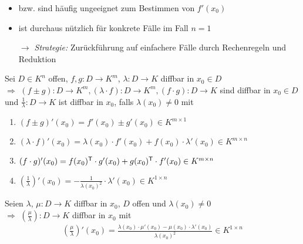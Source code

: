 \begin{underlinedenvironment}
	\hspace{0pt}
\begin{itemize}[topsep=-2pt]
	\item {} bzw.  sind häufig ungeeignet zum Bestimmen von $f'(x_0)$
	\item {} ist durchaus nützlich für konkrete Fälle im Fall $n=1$
	
	\emph{$\rightarrow$ Strategie:} Zurückführung auf einfachere Fälle durch Rechenregeln und Reduktion
\end{itemize}
\end{underlinedenvironment}

\begin{proposition}[Rechenregeln]
	Sei $D\in K^n$ offen, $f,g: D\to K^m$, $\lambda: D\to K$ \gls{diffbar} in $x_0\in D$ \\
	$\Rightarrow$ $(f\pm g): D\to K^m, (\lambda\cdot f):D\to K^m, (f\cdot g):D\to K$ sind \gls{diffbar} in $x_0\in D$ und $\frac{1}{\lambda}:D\to K$ ist \gls{diffbar} in $x_0$, falls $\lambda(x_0)\neq 0$
	mit
	\begin{enumerate}[label={\alph*)}]
		\item $(f\pm g)'(x_0) = f'(x_0) \pm g'(x_0)\in K^{m\times 1}$
		\item $(\lambda\cdot f)'(x_0) = \lambda (x_0)\cdot f'(x_0) + f(x_0)\cdot \lambda'(x_0)\in K^{m\times n}$
		\item $(f\cdot g)' (x_0) = f(x_0)^\mathsf{T}\cdot g'(x_0) + g(x_0)^\mathsf{T}\cdot f'(x_0)\in K^{m\times n}$
		\item $\left( \frac{1}{\lambda}\right)'(x_0) = - \frac{1}{\lambda(x_0)^2}\cdot \lambda'(x_0)\in K^{1\times n}$
	\end{enumerate}
\end{proposition}

\begin{conclusion}
	Seien $\lambda$, $\mu:D\to K$ \gls{diffbar} in $x_0$, $D$ offen und $\lambda(x_0)\neq 0$ \\
	$\Rightarrow$ $\left( \frac{\mu}{\lambda} \right): D\to K$ \gls{diffbar} in $x_0$ mit \begin{align*}
		\left( \frac{\mu}{\lambda} \right)' (x_0) = \frac{\lambda(x_0)\cdot \mu'(x_0) - \mu(x_0) \cdot \lambda'(x_0)}{\lambda(x_0)^2}\in K^{1\times n}
	\end{align*}
\end{conclusion}

